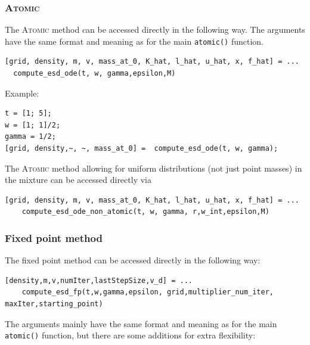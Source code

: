 \documentclass[english,11pt]{article} %
\begin{document}
\subsubsection{\textsc{Atomic}}

The \textsc{Atomic} method can be accessed directly in the following way. The arguments have the same format and meaning as for the main \verb+atomic()+ function. 

\begin{verbatim}
[grid, density, m, v, mass_at_0, K_hat, l_hat, u_hat, x, f_hat] = ...
  compute_esd_ode(t, w, gamma,epsilon,M)
\end{verbatim}

Example:

\begin{verbatim}
t = [1; 5]; 
w = [1; 1]/2;
gamma = 1/2; 
[grid, density,~, ~, mass_at_0] =  compute_esd_ode(t, w, gamma);
\end{verbatim}

The \textsc{Atomic} method allowing for uniform distributions (not just point masses) in the mixture can be accessed directly via

\begin{verbatim}
[grid, density, m, v, mass_at_0, K_hat, l_hat, u_hat, x, f_hat] = ...
    compute_esd_ode_non_atomic(t, w, gamma, r,w_int,epsilon,M)
\end{verbatim}


\subsubsection{Fixed point method}

The fixed point method can be accessed directly in the following way: 

\begin{verbatim}
[density,m,v,numIter,lastStepSize,v_d] = ...
    compute_esd_fp(t,w,gamma,epsilon, grid,multiplier_num_iter, maxIter,starting_point)
\end{verbatim}

 The arguments mainly have the same format and meaning as for the main \verb+atomic()+ function, but there are some additions for extra flexibility:  
 
\end{document}
